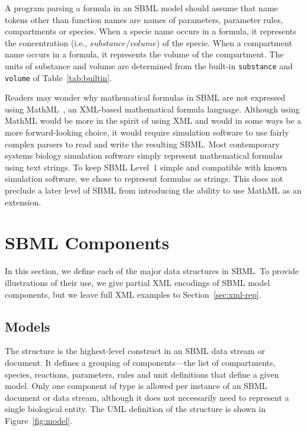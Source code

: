 \documentclass[10pt]{cekarticle}
\newcommand{\vref}[1]{\ref{#1}}
\begin{document}
A program parsing a formula in an SBML model should assume that name tokens
other than function names are names of parameters, parameter rules,
compartments or species.  When a specie name occurs in a formula, it
represents the concentration (i.e., $substance/volume$) of the specie.
When a compartment name occurs in a formula, it represents the volume of
the compartment.  The units of substance and volume are determined from the
built-in \texttt{substance} and \texttt{volume} of Table~\vref{tab:builtin}.

Readers may wonder why mathematical formulas in SBML are not expressed
using MathML~\citep{w3c:2000b}, an XML-based mathematical formula language.
Although using MathML would be more in the spirit of using XML and would in
some ways be a more forward-looking choice, it would require simulation
software to use fairly complex parsers to read and write the resulting
SBML.  Most contemporary systems biology simulation software simply
represent mathematical formulas using text strings.  To keep SBML Level~1
simple and compatible with known simulation software, we chose to represent
formulas as strings.  This does not preclude a later level of SBML from
introducing the ability to use MathML as an extension.


\section{SBML Components}
\label{sec:elements}

In this section, we define each of the major data structures in SBML.  To
provide illustrations of their use, we give partial XML encodings of SBML
model components, but we leave full XML examples to
Section~\ref{sec:xml-rep}.


\subsection{Models}
\label{sec:model}

The  structure is the highest-level construct in an SBML data
stream or document.  It defines a grouping of components---the list of
compartments, species, reactions, parameters, rules and unit definitions
that define a given model.  Only one component of type  is
allowed per instance of an SBML document or data stream, although it does
not necessarily need to represent a single biological entity.  The UML
definition of the  structure is shown in
Figure~\vref{fig:model}.
\end{document}
